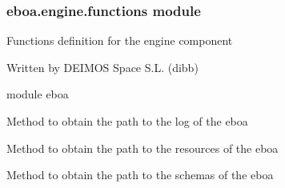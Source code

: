 \subsubsection{eboa.engine.functions module}
\label{\detokenize{eboa.engine:module-eboa.engine.functions}}\label{\detokenize{eboa.engine:eboa-engine-functions-module}}
Functions definition for the engine component

Written by DEIMOS Space S.L. (dibb)

module eboa

\begin{fulllineitems}
\label{\detokenize{eboa.engine:eboa.engine.functions.get_log_path}}
Method to obtain the path to the log of the eboa

\end{fulllineitems}


\begin{fulllineitems}
\label{\detokenize{eboa.engine:eboa.engine.functions.get_resources_path}}
Method to obtain the path to the resources of the eboa

\end{fulllineitems}


\begin{fulllineitems}
\label{\detokenize{eboa.engine:eboa.engine.functions.get_schemas_path}}
Method to obtain the path to the schemas of the eboa

\end{fulllineitems}

